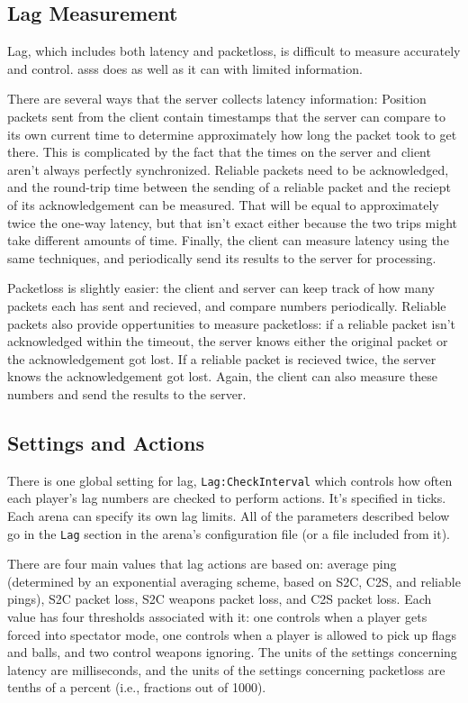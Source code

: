 \documentclass{article}
\newcommand{\asss}{asss}
\begin{document}
\subsection{Lag Measurement}

Lag, which includes both latency and packetloss, is difficult to measure
accurately and control. \asss{} does as well as it can with limited
information.

There are several ways that the server collects latency information:
Position packets sent from the client contain timestamps that the server
can compare to its own current time to determine approximately how long
the packet took to get there. This is complicated by the fact that the
times on the server and client aren't always perfectly synchronized.
Reliable packets need to be acknowledged, and the round-trip time
between the sending of a reliable packet and the reciept of its
acknowledgement can be measured. That will be equal to approximately
twice the one-way latency, but that isn't exact either because the two
trips might take different amounts of time. Finally, the client can
measure latency using the same techniques, and periodically send its
results to the server for processing.

Packetloss is slightly easier: the client and server can keep track of
how many packets each has sent and recieved, and compare numbers
periodically. Reliable packets also provide oppertunities to measure
packetloss: if a reliable packet isn't acknowledged within the timeout,
the server knows either the original packet or the acknowledgement got
lost. If a reliable packet is recieved twice, the server knows the
acknowledgement got lost. Again, the client can also measure these
numbers and send the results to the server.

\subsection{Settings and Actions}

There is one global setting for lag, \texttt{Lag:CheckInterval} which
controls how often each player's lag numbers are checked to perform
actions. It's specified in ticks. Each arena can specify its own lag
limits. All of the parameters described below go in the \texttt{Lag}
section in the arena's configuration file (or a file included from it).

There are four main values that lag actions are based on: average ping
(determined by an exponential averaging scheme, based on S2C, C2S, and
reliable pings), S2C packet loss, S2C weapons packet loss, and C2S
packet loss. Each value has four thresholds associated with it: one
controls when a player gets forced into spectator mode, one controls
when a player is allowed to pick up flags and balls, and two control
weapons ignoring. The units of the settings concerning latency are
milliseconds, and the units of the settings concerning packetloss are
tenths of a percent (i.e., fractions out of 1000).
\end{document}
